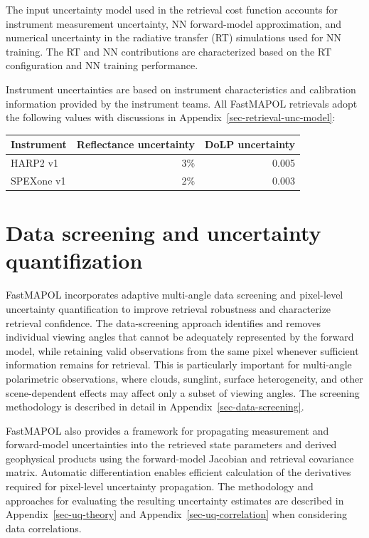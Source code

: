 \documentclass[
  11pt,
  letterpaper,
]{scrreprt}
\begin{document}
The input uncertainty model used in the retrieval cost function accounts
for instrument measurement uncertainty, NN forward-model approximation,
and numerical uncertainty in the radiative transfer (RT) simulations
used for NN training. The RT and NN contributions are characterized
based on the RT configuration and NN training performance.

Instrument uncertainties are based on instrument characteristics and
calibration information provided by the instrument teams. All FastMAPOL
retrievals adopt the following values with discussions in
Appendix~\ref{sec-retrieval-unc-model}:

\begin{longtable}[]{@{}lrr@{}}
\toprule\noalign{}
Instrument & Reflectance uncertainty & DoLP uncertainty \\
\midrule\noalign{}
\endhead
\bottomrule\noalign{}
\endlastfoot
HARP2 v1 & 3\% & 0.005 \\
SPEXone v1 & 2\% & 0.003 \\
\end{longtable}

\section{Data screening and uncertainty
quantifization}\label{data-screening-and-uncertainty-quantifization}

FastMAPOL incorporates adaptive multi-angle data screening and
pixel-level uncertainty quantification to improve retrieval robustness
and characterize retrieval confidence. The data-screening approach
identifies and removes individual viewing angles that cannot be
adequately represented by the forward model, while retaining valid
observations from the same pixel whenever sufficient information remains
for retrieval. This is particularly important for multi-angle
polarimetric observations, where clouds, sunglint, surface
heterogeneity, and other scene-dependent effects may affect only a
subset of viewing angles. The screening methodology is described in
detail in Appendix~\ref{sec-data-screening}.

FastMAPOL also provides a framework for propagating measurement and
forward-model uncertainties into the retrieved state parameters and
derived geophysical products using the forward-model Jacobian and
retrieval covariance matrix. Automatic differentiation enables efficient
calculation of the derivatives required for pixel-level uncertainty
propagation. The methodology and approaches for evaluating the resulting
uncertainty estimates are described in Appendix~\ref{sec-uq-theory} and
Appendix~\ref{sec-uq-correlation} when considering data correlations.
\end{document}
